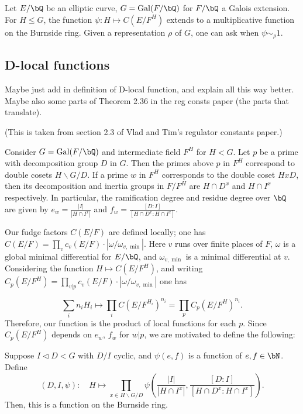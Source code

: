 \begin{example}
Let $E / \bQ$ be an elliptic curve, $G = \Gal(F / \bQ)$ for $F / \bQ$ a Galois extension. For $H \leq G$, the function $\psi \colon H \mapsto C(E / F^H)$ extends to a multiplicative function on the Burnside ring. Given a representation $\rho$ of $G$, one can ask when $\psi \sim_{\rho} 1$.
\end{example}

\subsection{D-local functions}\label{D-loc}





{\color{red} Maybe just add in definition of D-local function, and explain all this way better. Maybe also some parts of Theorem 2.36 in the reg consts paper (the parts that translate).}

(This is taken from section 2.3 of Vlad and Tim's regulator constants paper.)

Consider $G = \Gal(F / \bQ)$ and intermediate field $F^H$ for $H < G$. Let $p$ be a prime with decomposition group $D$ in $G$. 
Then the primes above $p$ in $F^H$ correspond to double cosets $H\backslash G/ D$. If a prime $w$ in $F^H$ corresponds to the double coset $HxD$, then its decomposition and inertia groups in $F / F^H$ are $H \cap D^x$ and $H \cap I^x$ respectively. In particular, the ramification degree and residue degree over $\bQ$ are given by $e_w = \frac{|I|}{|H \cap I^x|}$ and $f_w = \frac{[D \colon I]}{[H \cap D^x \colon H \cap I^x]}$. 

Our fudge factors $C(E / F)$ are defined locally; one has $C(E / F) = \prod_v c_v(E / F) \cdot |\omega / \omega_{v, \min}|$. Here $v$ runs over finite places of $F$, $\omega$ is a global minimal differential for $E / \bQ$, and $\omega_{v, \min}$ is a minimal differential at $v$.
Considering the function $H \mapsto C(E / F^H)$, and writing $C_p(E / F^H) =\prod_{v | p} c_v(E / F)\cdot |\omega / \omega_{v, \min}|$ one has

\[ \sum_{i} n_i H_i \mapsto \prod_i C(E / F^{H_i})^{n_i} = \prod_{p} C_p(E / F^H)^{n_i}. \]
Therefore, our function is the product of local functions for each $p$. Since $C_p(E / F^H)$ depends on $e_w$, $f_w$ for $w | p$, we are motivated to define the following:

\begin{defn}\label{D-I-fn}
    Suppose $I \triangleleft D < G$ with $D / I$ cyclic, and $\psi(e,f)$ is a function of $e, f \in \bN$. Define
    \[ \left(D, I, \psi\right) \colon \quad H \mapsto \prod_{x \in H\backslash G / D} \psi\left(\frac{|I|}{|H \cap I^x|}, \frac{[D \colon I]}{[H \cap D^x \colon H \cap I^x]}\right). \]
    Then, this is a function on the Burnside ring.
\end{defn}

